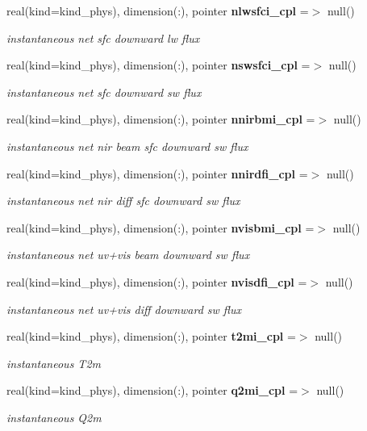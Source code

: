 \begin{DoxyCompactItemize}
real(kind=kind\+\_\+phys), dimension(\+:), pointer \textbf{ nlwsfci\+\_\+cpl} =$>$ null()
\begin{DoxyCompactList}\small\item\em instantaneous net sfc downward lw flux \end{DoxyCompactList}\item 
real(kind=kind\+\_\+phys), dimension(\+:), pointer \textbf{ nswsfci\+\_\+cpl} =$>$ null()
\begin{DoxyCompactList}\small\item\em instantaneous net sfc downward sw flux \end{DoxyCompactList}\item 
real(kind=kind\+\_\+phys), dimension(\+:), pointer \textbf{ nnirbmi\+\_\+cpl} =$>$ null()
\begin{DoxyCompactList}\small\item\em instantaneous net nir beam sfc downward sw flux \end{DoxyCompactList}\item 
real(kind=kind\+\_\+phys), dimension(\+:), pointer \textbf{ nnirdfi\+\_\+cpl} =$>$ null()
\begin{DoxyCompactList}\small\item\em instantaneous net nir diff sfc downward sw flux \end{DoxyCompactList}\item 
real(kind=kind\+\_\+phys), dimension(\+:), pointer \textbf{ nvisbmi\+\_\+cpl} =$>$ null()
\begin{DoxyCompactList}\small\item\em instantaneous net uv+vis beam downward sw flux \end{DoxyCompactList}\item 
real(kind=kind\+\_\+phys), dimension(\+:), pointer \textbf{ nvisdfi\+\_\+cpl} =$>$ null()
\begin{DoxyCompactList}\small\item\em instantaneous net uv+vis diff downward sw flux \end{DoxyCompactList}\item 
real(kind=kind\+\_\+phys), dimension(\+:), pointer \textbf{ t2mi\+\_\+cpl} =$>$ null()
\begin{DoxyCompactList}\small\item\em instantaneous T2m \end{DoxyCompactList}\item 
real(kind=kind\+\_\+phys), dimension(\+:), pointer \textbf{ q2mi\+\_\+cpl} =$>$ null()
\begin{DoxyCompactList}\small\item\em instantaneous Q2m \end{DoxyCompactList}\item 

\end{DoxyCompactItemize}
